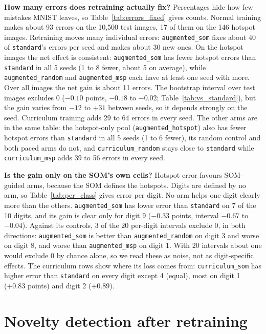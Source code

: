 \documentclass[11pt]{article}
\begin{document}
\textbf{How many errors does retraining actually fix?} Percentages hide how few mistakes MNIST leaves, so Table~\ref{tab:errors_fixed} gives counts. Normal training makes about 93 errors on the 10{,}500 test images, 17 of them on the 146 hotspot images. Retraining moves many individual errors: \texttt{augmented\_som} fixes about 40 of \texttt{standard}'s errors per seed and makes about 30 new ones. On the hotspot images the net effect is consistent: \texttt{augmented\_som} has fewer hotspot errors than \texttt{standard} in all 5 seeds (1 to 8 fewer, about 5 on average), while \texttt{augmented\_random} and \texttt{augmented\_msp} each have at least one seed with more. Over all images the net gain is about 11 errors. The bootstrap interval over test images excludes 0 ($-0.10$ points, $-0.18$ to $-0.02$; Table~\ref{tab:vs_standard}), but the gain varies from $-12$ to $+31$ between seeds, so it depends strongly on the seed. Curriculum training adds 29 to 64 errors in every seed. The other arms are in the same table: the hotspot-only pool (\texttt{augmented\_hotspot}) also has fewer hotspot errors than \texttt{standard} in all 5 seeds (1 to 6 fewer), its random control and both paced arms do not, and \texttt{curriculum\_random} stays close to \texttt{standard} while \texttt{curriculum\_msp} adds 39 to 56 errors in every seed.



\textbf{Is the gain only on the SOM's own cells?} Hotspot error favours SOM-guided arms, because the SOM defines the hotspots. Digits are defined by no arm, so Table~\ref{tab:per_class} gives error per digit. No arm helps one digit clearly more than the others. \texttt{augmented\_som} has lower error than \texttt{standard} on 7 of the 10 digits, and its gain is clear only for digit 9 ($-0.33$ points, interval $-0.67$ to $-0.04$). Against its controls, 3 of the 20 per-digit intervals exclude 0, in both directions: \texttt{augmented\_som} is better than \texttt{augmented\_random} on digit 3 and worse on digit 8, and worse than \texttt{augmented\_msp} on digit 1. With 20 intervals about one would exclude 0 by chance alone, so we read these as noise, not as digit-specific effects. The curriculum rows show where its loss comes from: \texttt{curriculum\_som} has higher error than \texttt{standard} on every digit except 4 (equal), most on digit 1 (+0.83 points) and digit 2 (+0.89).



\section{Novelty detection after retraining}\label{sec:novelty_after}
\end{document}
